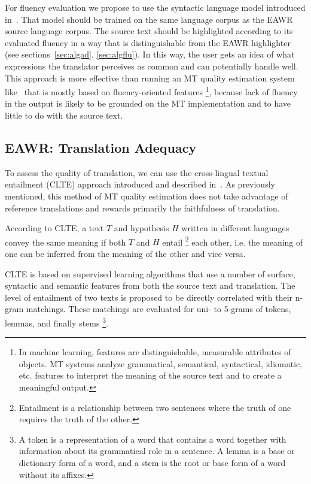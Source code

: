 \documentclass[hidelinks,10pt,letter]{article} %
\begin{document}
    For fluency evaluation we propose to use the syntactic language model introduced in~\cite{paulslarge}.    
    That model should be trained on the same language corpus as the EAWR source language corpus.
    The source text should be highlighted according to its evaluated fluency in a way that is distinguishable from the EAWR highlighter 
    (see sections~\ref{sec:algad}, \ref{sec:algflu}). 
    In this way, the user gets an idea of what expressions the translator
    perceives as common and can potentially handle well. This approach is more effective than running an
    MT quality estimation system like~\cite{bach2011goodness} that is mostly based on fluency-oriented features%
    \footnote{In machine learning, features are distinguishable, measurable attributes of objects. MT systems analyze
    grammatical, semantical, syntactical, idiomatic, etc. features to interpret the meaning of the source text and 
    to create a meaningful output.}, because lack of fluency in the output is likely to be grounded on the MT implementation 
    and to have little to do with the source text.
    
    \subsection{EAWR: Translation Adequacy}\label{sec:eawrta}
    To assess the quality of translation, we can use the cross-lingual textual entailment (CLTE) approach introduced and described
    in~\cite{mehdad2010towards,mehdad2012match}. As previously mentioned, this method of MT quality estimation does not take advantage of reference
    translations and rewards primarily the faithfulness of translation. 
    
    According to CLTE, a text $T$ and hypothesis $H$ written in different languages
    convey the same meaning if both $T$ and $H$ entail%
    \footnote{Entailment is a relationship between two sentences where the truth of one requires the truth of the other.}
    each other, i.e. the meaning of one can be inferred from the meaning of the other and vice versa.
    
    CLTE is based on supervised learning algorithms that use a number of surface, syntactic and semantic features from both the source text and translation.
    The level of entailment of two texts is proposed to be directly correlated with their n-gram matchings. These matchings
    are evaluated for uni- to 5-grams of tokens, lemmas, and finally stems%
    \footnote{A token is a representation of a word that contains a word together with information about its grammatical role in a sentence. A lemma is
    a base or dictionary form of a word, and a stem is the root or base form of a word without its affixes.}.
    
\end{document}
